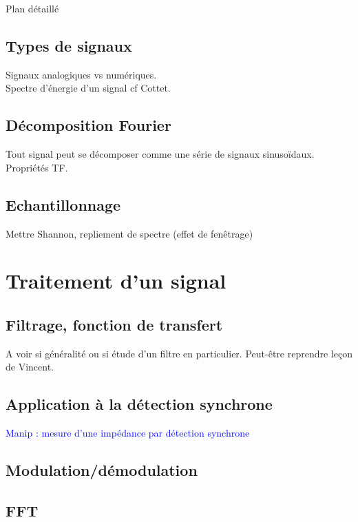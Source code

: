 \begin{reportBlock}{Plan détaillé}
\subsection{Types de signaux}
Signaux analogiques vs numériques.\\
Spectre d'énergie d'un signal cf Cottet.\\
\subsection{Décomposition Fourier}
Tout signal peut se décomposer comme une série de signaux sinusoïdaux.\\
Propriétés TF.
\subsection{Echantillonnage}
Mettre Shannon, repliement de spectre (effet de fenêtrage)

\section{Traitement d'un signal}

\subsection{Filtrage, fonction de transfert}
A voir si généralité ou si étude d'un filtre en particulier. Peut-être reprendre leçon de Vincent.
\subsection{Application à la détection synchrone}
\textcolor{blue}{Manip : mesure d'une impédance par détection synchrone}

\subsection{Modulation/démodulation}

\subsection{FFT}

\end{reportBlock}
